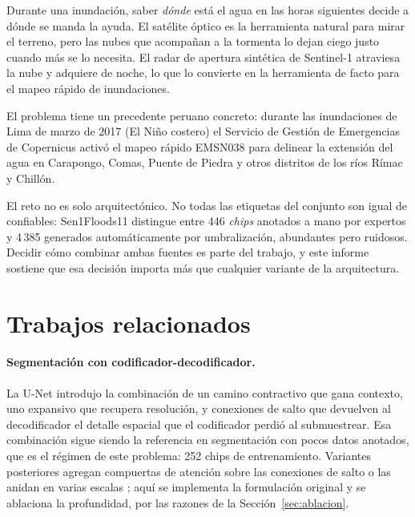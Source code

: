 \documentclass{article}
\begin{document}
Durante una inundación, saber \emph{dónde} está el agua en las horas siguientes
decide a dónde se manda la ayuda. El satélite óptico es la herramienta natural
para mirar el terreno, pero las nubes que acompañan a la tormenta lo dejan ciego
justo cuando más se lo necesita. El radar de apertura sintética de Sentinel-1
\citep{torres2012sentinel1} atraviesa la nube y adquiere de noche, lo que lo
convierte en la herramienta de facto para el mapeo rápido de inundaciones.

El problema tiene un precedente peruano concreto: durante las inundaciones de
Lima de marzo de 2017 (El Niño costero) el Servicio de Gestión de
Emergencias de Copernicus activó el mapeo rápido EMSN038
\citep{copernicus2017emsn038} para delinear la extensión del agua en Carapongo,
Comas, Puente de Piedra y otros distritos de los ríos Rímac y Chillón.

El reto no es solo arquitectónico. No todas las etiquetas del conjunto son igual
de confiables: Sen1Floods11 \citep{bonafilia2020sen1floods11} distingue entre 446
\emph{chips} anotados a mano por expertos y 4\,385 generados automáticamente por
umbralización, abundantes pero ruidosos. Decidir cómo combinar ambas fuentes es
parte del trabajo, y este informe sostiene que esa decisión importa más que
cualquier variante de la arquitectura.

\section{Trabajos relacionados}

\paragraph{Segmentación con codificador-decodificador.}
La U-Net \citep{ronneberger2015unet} introdujo la combinación de un camino
contractivo que gana contexto, uno expansivo que recupera resolución, y
conexiones de salto que devuelven al decodificador el detalle espacial que el
codificador perdió al submuestrear. Esa combinación sigue siendo la referencia
en segmentación con pocos datos anotados, que es el régimen de este
problema: 252 chips de entrenamiento. Variantes posteriores agregan compuertas
de atención sobre las conexiones de salto \citep{oktay2018attention} o las
anidan en varias escalas \citep{zhou2018unetpp}; aquí se implementa la
formulación original y se ablaciona la profundidad, por las razones de la
Sección~\ref{sec:ablacion}.
\end{document}
